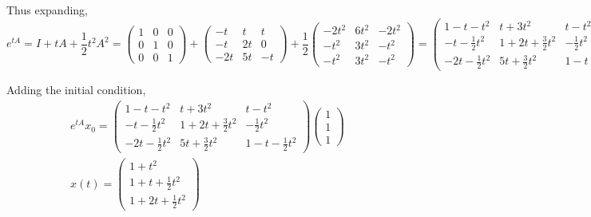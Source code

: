 \documentclass[12pt]{article}
\begin{document}
\begin{enumerate}
        Thus expanding, 
        \[e^{tA} = I + tA + \frac{1}{2}t^2A^2 = \begin{pmatrix}
            1 & 0 & 0\\
            0 & 1 & 0\\
            0 & 0 & 1
        \end{pmatrix} + \begin{pmatrix}
            -t & t & t\\
            -t & 2t & 0\\
            -2t & 5t & -t
        \end{pmatrix} + \frac{1}{2}\begin{pmatrix}
            -2t^2 & 6t^2 & -2t^2\\ 
            -t^2 & 3t^2 & -t^2\\ 
            -t^2 & 3t^2 & -t^2
        \end{pmatrix} = \begin{pmatrix}
           1- t - t^2 & t + 3t^2 & t - t^2\\
           -t - \frac{1}{2}t^2 & 1 + 2t + \frac{3}{2}t^2 & -\frac{1}{2}t^2\\ 
           -2t - \frac{1}{2}t^2 & 5t + \frac{3}{2}t^2 & 1 - t - \frac{1}{2}t^2
        \end{pmatrix}\]
        
        Adding the initial condition, 
        \begin{gather*}
            e^{tA} x_0 = \begin{pmatrix}
                1- t - t^2 & t + 3t^2 & t - t^2\\
                -t - \frac{1}{2}t^2 & 1 + 2t + \frac{3}{2}t^2 & -\frac{1}{2}t^2\\ 
                -2t - \frac{1}{2}t^2 & 5t + \frac{3}{2}t^2 & 1 - t - \frac{1}{2}t^2
            \end{pmatrix} \begin{pmatrix}
                1\\1\\1
            \end{pmatrix}\\
            \boxed{x(t) = \begin{pmatrix}
                1 + t^2\\ 
                1 + t + \frac{1}{2}t^2\\ 
                1 + 2t + \frac{1}{2}t^2 
            \end{pmatrix}}
        \end{gather*}
    \color{black}


\end{enumerate}
\end{document}
